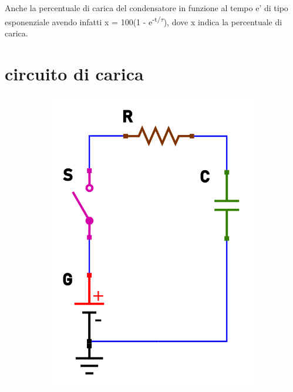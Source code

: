 \documentclass[12pt]{article}
\begin{document}
Anche la percentuale di carica del condensatore in funzione al tempo e' di tipo esponenziale
avendo infatti x = 100(1 - e\textsuperscript{-t/$\tau$}), dove x indica la percentuale di carica.


\newpage

\section*{circuito di carica}

\begin{figure}[h!]
  \centering
  \begin{subfigure}[b]{0.3\linewidth}
    \includegraphics[width=\linewidth]{data/carica-open.png}
  \end{subfigure}
  \begin{subfigure}[b]{0.3\linewidth}

\end{subfigure}
\end{figure}
\end{document}
